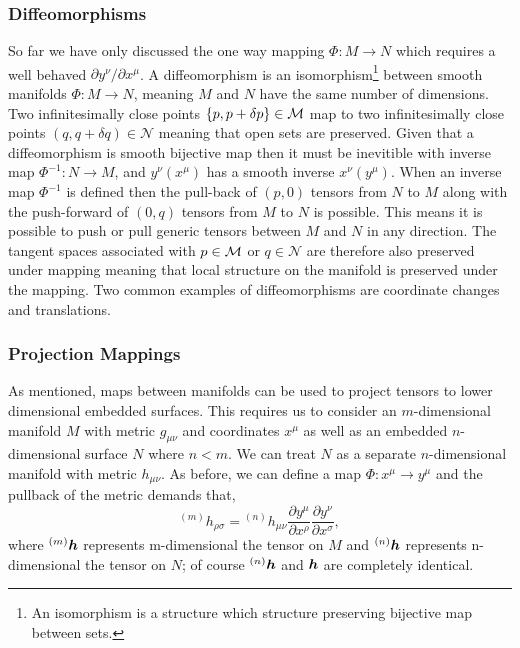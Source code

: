 \subsubsection{Diffeomorphisms}
So far we have only discussed the one way mapping $\Phi :M \rightarrow N$ which requires a well behaved $\partial y^\nu / \partial x^\mu$. A diffeomorphism is an isomorphism\footnote{An isomorphism is a structure {\color{gren} which structure} preserving bijective map between sets.} between smooth manifolds $\Phi :M \rightarrow N$, meaning $M$ and $N$ have the same number of dimensions. Two infinitesimally close points $\{p,p+\delta p\}\in\mathcal{M}$ map to two infinitesimally close points $(q,q+\delta q)\in\mathcal{N}$ meaning that open sets are preserved. Given that a diffeomorphism is smooth bijective map then it must be inevitible with inverse map $\Phi^{-1}:N \rightarrow M$, and $y^\nu(x^\mu)$ has a smooth inverse $x^\nu(y^\mu)$. When an inverse map $\Phi^{-1}$ is defined then the pull-back of $(p,0)$ tensors from $N$ to $M$ along with the push-forward of $(0,q)$ tensors from $M$ to $N$ is possible. This means it is possible to push or pull generic tensors between $M$ and $N$ in any direction. The tangent spaces associated with $p \in \mathcal{M}$ or $q \in \mathcal{N}$ are therefore also preserved under mapping meaning that local structure on the manifold is preserved under the mapping. Two common examples of diffeomorphisms are coordinate changes and translations.

\subsubsection{Projection Mappings}
As mentioned, maps between manifolds can be used to project tensors to lower dimensional embedded surfaces. This requires us to consider an $m$-dimensional manifold $M$ with metric $g_{\mu\nu}$ and coordinates $x^\mu$ as well as an embedded $n$-dimensional surface $N$ where $n<m$. We can treat $N$ as a separate $n$-dimensional manifold with metric $h_{\mu\nu}$. As before, we can define a map $\Phi:x^\mu \rightarrow y^\mu$ and the pullback of the metric demands that,
\begin{equation}
{}^{(m)}h_{\rho\sigma} = {}^{(n)}h_{\mu\nu}\frac{\partial y^\mu  }{\partial x^\rho  } \frac{\partial y^\nu  }{\partial x^\sigma  },
\end{equation}
where ${}^{(m)}\boldsymbol{h}$ represents m-dimensional the tensor on $M$ and ${}^{(n)}\boldsymbol{h}$ represents n-dimensional the tensor on $N$; of course ${}^{(n)}\boldsymbol{h}$ and $\boldsymbol{h}$ are completely identical.

